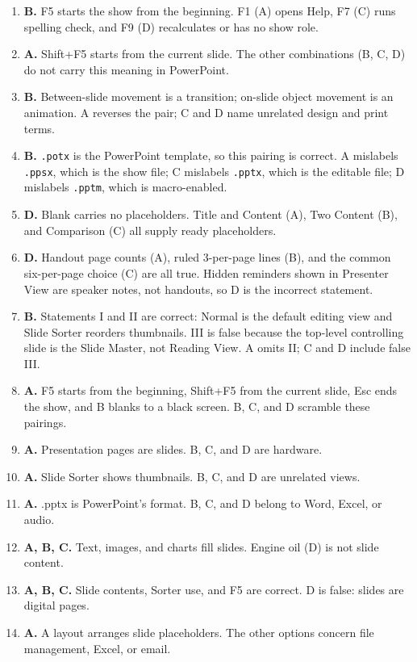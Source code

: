 \begin{enumerate}[label=\textbf{Q\arabic*.}, leftmargin=*]
  Notes (A) serve the speaker, placeholders (C) hold content, and
  transitions (D) move between slides.
\item \textbf{B.} F5 starts the show from the beginning. F1 (A) opens Help,
  F7 (C) runs spelling check, and F9 (D) recalculates or has no show role.
\item \textbf{A.} Shift+F5 starts from the current slide. The other
  combinations (B, C, D) do not carry this meaning in PowerPoint.
\item \textbf{B.} Between-slide movement is a transition; on-slide object
  movement is an animation. A reverses the pair; C and D name unrelated
  design and print terms.
\item \textbf{B.} \texttt{.potx} is the PowerPoint template, so this pairing
  is correct. A mislabels \texttt{.ppsx}, which is the show file; C mislabels
  \texttt{.pptx}, which is the editable file; D mislabels \texttt{.pptm},
  which is macro-enabled.
\item \textbf{D.} Blank carries no placeholders. Title and Content (A), Two
  Content (B), and Comparison (C) all supply ready placeholders.
\item \textbf{D.} Handout page counts (A), ruled 3-per-page lines (B), and
  the common six-per-page choice (C) are all true. Hidden reminders shown in
  Presenter View are speaker notes, not handouts, so D is the incorrect
  statement.
\item \textbf{B.} Statements I and II are correct: Normal is the default
  editing view and Slide Sorter reorders thumbnails. III is false because
  the top-level controlling slide is the Slide Master, not Reading View. A
  omits II; C and D include false III.
\item \textbf{A.} F5 starts from the beginning, Shift+F5 from the current
  slide, Esc ends the show, and B blanks to a black screen. B, C, and D
  scramble these pairings.

\item \textbf{A.} Presentation pages are slides. B, C, and D are hardware.
\item \textbf{A.} Slide Sorter shows thumbnails. B, C, and D are unrelated views.
\item \textbf{A.} .pptx is PowerPoint's format. B, C, and D belong to Word, Excel, or audio.
\item \textbf{A, B, C.} Text, images, and charts fill slides. Engine oil (D) is not slide content.
\item \textbf{A, B, C.} Slide contents, Sorter use, and F5 are correct. D is false: slides are digital pages.
\item \textbf{A.} A layout arranges slide placeholders. The other options concern file management, Excel, or email.


\end{enumerate}
